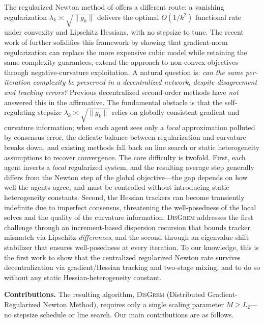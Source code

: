 \documentclass[10pt,twocolumn,letterpaper]{article}
\def\cO{O}%
\theoremstyle{compact}
\theoremstyle{compactremark}
\newcommand{\cO}{\mathcal{O}}
\begin{document}
	The regularized Newton method of \citet{mishchenko2023rn} offers a
	different route: a vanishing regularization
	$\lambda_k\asymp\sqrt{\|g_k\|}$ delivers the optimal $\cO(1/k^2)$
	functional rate under convexity and Lipschitz Hessians, with no
	stepsize to tune.
	The recent work of \citet{doikov2024gradient} further solidifies
	this framework by showing that gradient-norm regularization can
	replace the more expensive cubic model while retaining the same
	complexity guarantees; \citet{ding2025nonconvex} extend the
	approach to non-convex objectives through negative-curvature
	exploitation.
	A natural question is:
	\emph{can the same per-iteration complexity be preserved in a
	decentralized network, despite disagreement and tracking errors?}
	Previous decentralized second-order methods have \emph{not} answered
	this in the affirmative.
	The fundamental obstacle is that the self-regulating stepsize
	$\lambda_k\asymp\sqrt{\|g_k\|}$ relies on globally consistent
	gradient and curvature information;
	when each agent sees only a \emph{local} approximation polluted by
	consensus error, the delicate balance between regularization and
	curvature breaks down, and existing methods fall back on line
	search or static heterogeneity assumptions to
	recover convergence.
	The core difficulty is twofold.
	First, each agent inverts a \emph{local} regularized system, and
	the resulting average step generally differs from the Newton step
	of the global objective---the gap depends on how well the agents
	agree, and must be controlled without introducing static
	heterogeneity constants.
	Second, the Hessian trackers can become transiently indefinite
	due to imperfect consensus, threatening the well-posedness of
	the local solves and the quality of the curvature information.
	\textsc{DisGrem} addresses the first challenge through an
	increment-based dispersion recursion that bounds tracker
	mismatch via Lipschitz \emph{differences}, and the second
	through an eigenvalue-shift stabilizer that ensures
	well-posedness at every iteration.
	To our knowledge, this is the first work to show that the
	centralized regularized Newton rate survives decentralization via
	gradient/Hessian tracking and two-stage mixing, and to do so
	without any static Hessian-heterogeneity constant.
	
\noindent\textbf{Contributions.}
The resulting algorithm, \textsc{DisGrem} (Distributed
Gradient-Regularized Newton Method), requires only a single
scaling parameter $M\ge L_2$---no stepsize schedule or line
search.
Our main contributions are as follows.
\end{document}
